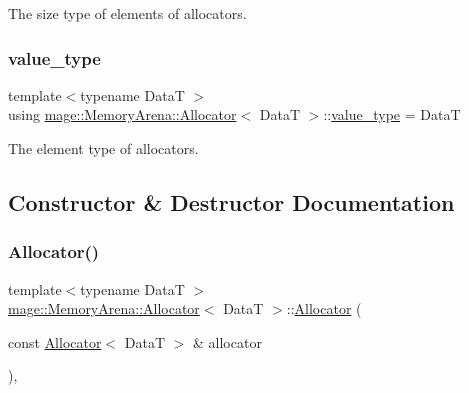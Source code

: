 The size type of elements of allocators. \hypertarget{structmage_1_1_memory_arena_1_1_allocator_a6ae3ef840bd738889b2c4136294a4f6d}{}\label{structmage_1_1_memory_arena_1_1_allocator_a6ae3ef840bd738889b2c4136294a4f6d} 
\subsubsection{\texorpdfstring{value\+\_\+type}{value\_type}}
{\footnotesize\ttfamily template$<$typename DataT $>$ \\
using \hyperlink{structmage_1_1_memory_arena_1_1_allocator}{mage\+::\+Memory\+Arena\+::\+Allocator}$<$ DataT $>$\+::\hyperlink{structmage_1_1_memory_arena_1_1_allocator_a6ae3ef840bd738889b2c4136294a4f6d}{value\+\_\+type} =  DataT}

The element type of allocators. 

\subsection{Constructor \& Destructor Documentation}
\hypertarget{structmage_1_1_memory_arena_1_1_allocator_ac7d640d69207604612c29ebc60ec6648}{}\label{structmage_1_1_memory_arena_1_1_allocator_ac7d640d69207604612c29ebc60ec6648} 
\subsubsection{\texorpdfstring{Allocator()}{Allocator()}\hspace{0.1cm}{\footnotesize\ttfamily [1/4]}}
{\footnotesize\ttfamily template$<$typename DataT $>$ \\
\hyperlink{structmage_1_1_memory_arena_1_1_allocator}{mage\+::\+Memory\+Arena\+::\+Allocator}$<$ DataT $>$\+::\hyperlink{structmage_1_1_memory_arena_1_1_allocator}{Allocator} (\begin{DoxyParamCaption}\item[{const \hyperlink{structmage_1_1_memory_arena_1_1_allocator}{Allocator}$<$ DataT $>$ \&}]{allocator }\end{DoxyParamCaption})\hspace{0.3cm}{\ttfamily [default]}, {\ttfamily [noexcept]}}

